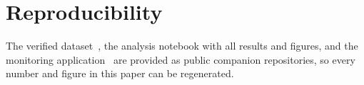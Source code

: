 \documentclass[conference]{IEEEtran}
\begin{document}
\section*{Reproducibility}
The verified dataset~\cite{dataset_repo}, the analysis notebook with all results and figures, and
the monitoring application~\cite{software_repo} are provided as public companion repositories, so
every number and figure in this paper can be regenerated.



\end{document}
